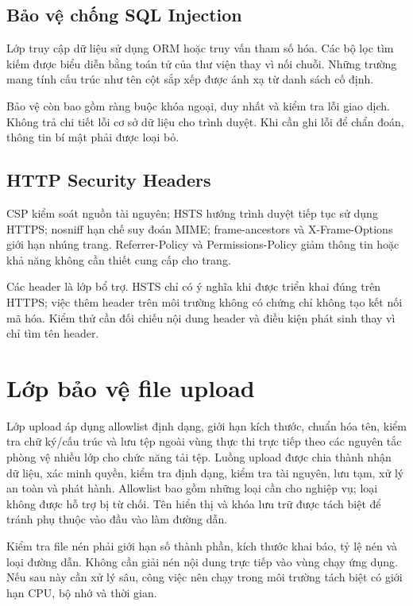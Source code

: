 \subsection{Bảo vệ chống SQL Injection}
Lớp truy cập dữ liệu sử dụng ORM hoặc truy vấn tham số hóa. Các bộ lọc tìm kiếm được biểu diễn bằng toán tử của thư viện thay vì nối chuỗi. Những trường mang tính cấu trúc như tên cột sắp xếp được ánh xạ từ danh sách cố định.

Bảo vệ còn bao gồm ràng buộc khóa ngoại, duy nhất và kiểm tra lỗi giao dịch. Không trả chi tiết lỗi cơ sở dữ liệu cho trình duyệt. Khi cần ghi lỗi để chẩn đoán, thông tin bí mật phải được loại bỏ.
\subsection{HTTP Security Headers}
CSP kiểm soát nguồn tài nguyên; HSTS hướng trình duyệt tiếp tục sử dụng HTTPS; nosniff hạn chế suy đoán MIME; frame-ancestors và X-Frame-Options giới hạn nhúng trang. Referrer-Policy và Permissions-Policy giảm thông tin hoặc khả năng không cần thiết cung cấp cho trang.

Các header là lớp bổ trợ. HSTS chỉ có ý nghĩa khi được triển khai đúng trên HTTPS; việc thêm header trên môi trường không có chứng chỉ không tạo kết nối mã hóa. Kiểm thử cần đối chiếu nội dung header và điều kiện phát sinh thay vì chỉ tìm tên header.

\section{Lớp bảo vệ file upload}
Lớp upload áp dụng allowlist định dạng, giới hạn kích thước, chuẩn hóa tên, kiểm tra chữ ký/cấu trúc và lưu tệp ngoài vùng thực thi trực tiếp theo các nguyên tắc phòng vệ nhiều lớp cho chức năng tải tệp.\cite{upload}
Luồng upload được chia thành nhận dữ liệu, xác minh quyền, kiểm tra định dạng, kiểm tra tài nguyên, lưu tạm, xử lý an toàn và phát hành. Allowlist bao gồm những loại cần cho nghiệp vụ; loại không được hỗ trợ bị từ chối. Tên hiển thị và khóa lưu trữ được tách biệt để tránh phụ thuộc vào đầu vào làm đường dẫn.

Kiểm tra file nén phải giới hạn số thành phần, kích thước khai báo, tỷ lệ nén và loại đường dẫn. Không cần giải nén nội dung trực tiếp vào vùng chạy ứng dụng. Nếu sau này cần xử lý sâu, công việc nên chạy trong môi trường tách biệt có giới hạn CPU, bộ nhớ và thời gian.

